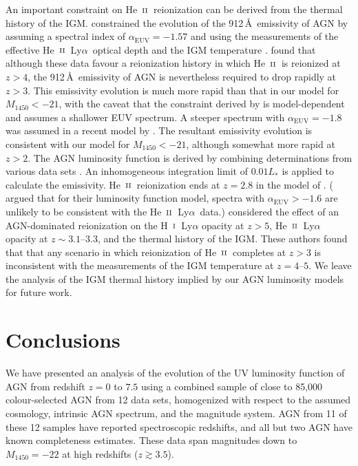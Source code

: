 \documentclass[fleqn,usenatbib]{mnras}
\def\lya{Ly$\alpha$~}
\def\HI{\hbox{H~$\scriptstyle\rm I$}}
\def\HeII{\hbox{He~$\scriptstyle\rm II$}}
\begin{document}
      An important constraint on \HeII\ reionization can be derived from the
      thermal history of the IGM.  \citet{2018MNRAS.473.1416M} constrained
      the evolution of the 912\,\AA\ emissivity of AGN by assuming a
      spectral index of $\alpha_\mathrm{EUV}=-1.57$ and using the
      measurements of the effective \HeII\ \lya optical depth
      \citep{2016ApJ...825..144W} and the IGM temperature
      \citep{2011MNRAS.410.1096B}.  \citet{2018MNRAS.473.1416M} found that
      although these data favour a reionization history in which \HeII\ is
      reionized at $z>4$, the 912\,\AA\ emissivity of AGN is nevertheless
      required to drop rapidly at $z>3$.  This emissivity evolution is much
      more rapid than that in our model for $M_\mathrm{1450}<-21$, with the
      caveat that the constraint derived by \citet{2018MNRAS.473.1416M} is
      model-dependent and assumes a shallower EUV spectrum.  A steeper
      spectrum with $\alpha_\mathrm{EUV}=-1.8$ was assumed in a recent model
      by \citet{2018arXiv180109693K}.  The resultant emissivity evolution is
      consistent with our model for $M_\mathrm{1450}<-21$, although somewhat
      more rapid at $z>2$.  The AGN luminosity function is derived by
      combining determinations from various data sets
      \citep{2015MNRAS.451L..30K}.  An inhomogeneous integration limit of
      $0.01L_*$ is applied to calculate the emissivity.  \HeII\ reionization
      ends at $z=2.8$ in the model of \citet{2018arXiv180109693K}.
      (\citealt{2017MNRAS.471..255K} argued that for their luminosity
      function model, spectra with $\alpha_\mathrm{EUV}>-1.6$ are unlikely
      to be consistent with the \HeII\ \lya data.)
      \citet{2017MNRAS.468.4691D} considered the effect of an AGN-dominated
      reionization on the \HI\ Ly$\alpha$ opacity at $z>5$,
      \HeII\ Ly$\alpha$ opacity at $z\sim 3.1$--$3.3$, and the thermal
      history of the IGM.  These authors found that that any scenario in
      which reionization of \HeII\ completes at $z>3$ is inconsistent with
      the measurements of the IGM temperature at $z=4$--$5$.  We leave the
      analysis of the IGM thermal history implied by our AGN luminosity
      models for future work.

      \section{Conclusions}
      \label{sec:conc}

      We have presented an analysis of the evolution of the UV luminosity
      function of AGN from redshift $z=0$ to $7.5$ using a combined sample
      of close to 85,000 colour-selected AGN from 12 data sets, homogenized
      with respect to the assumed cosmology, intrinsic AGN spectrum, and the
      magnitude system.  AGN from 11 of these 12 samples have reported
      spectroscopic redshifts, and all but two AGN have known completeness
      estimates.  These data span magnitudes down to $M_{1450}=-22$ at high
      redshifts ($z\gtrsim 3.5$).
\end{document}
